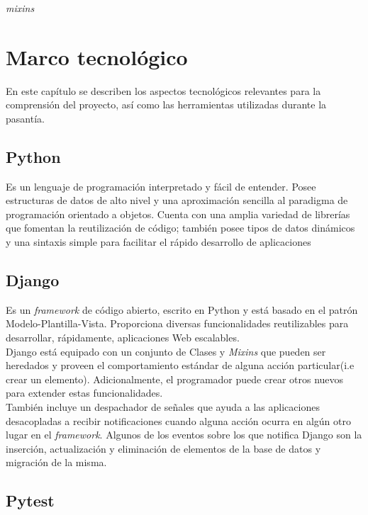 \textit{mixins}\chapter{\textbf{Marco tecnológico}}

\thispagestyle{empty}

En este capítulo se describen los aspectos tecnológicos relevantes para la comprensión del proyecto, así como las herramientas utilizadas durante la pasantía.


\section{Python}

Es un lenguaje de programación interpretado y fácil de entender. Posee estructuras de datos de alto nivel y una aproximación sencilla al paradigma de programación orientado a objetos. Cuenta con una amplia variedad de librerías que fomentan la reutilización de código; también posee tipos de datos dinámicos y una sintaxis simple para facilitar el rápido desarrollo de aplicaciones
 \cite{Python_tutorial}

\section{Django}

Es un \textit{framework} de código abierto, escrito en Python y está basado en el patrón Modelo-Plantilla-Vista. Proporciona diversas funcionalidades reutilizables para desarrollar, rápidamente, aplicaciones Web escalables. \cite{MVT}\\ %

Django está equipado con un conjunto de Clases y \textit{Mixins} que pueden ser heredados y proveen el comportamiento estándar de alguna acción particular(i.e crear un elemento). Adicionalmente, el programador puede crear otros nuevos para extender estas funcionalidades. \\

También incluye un despachador de señales que ayuda a las aplicaciones desacopladas a recibir notificaciones cuando alguna acción ocurra en algún otro lugar en el \textit{framework}. Algunos de los  eventos sobre los que notifica Django son la inserción, actualización y eliminación de elementos de la base de datos y migración de la misma.

\section{Pytest}

